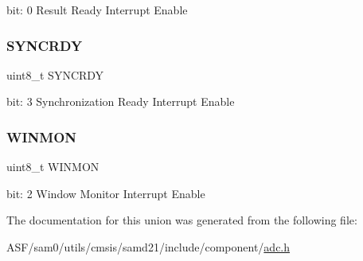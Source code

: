 bit\+: 0 Result Ready Interrupt Enable \mbox{\label{union_a_d_c___i_n_t_e_n_s_e_t___type_aece75e176e4fd55bf68937f1b56bde63}} 
\subsubsection{\texorpdfstring{SYNCRDY}{SYNCRDY}}
{\footnotesize\ttfamily uint8\+\_\+t S\+Y\+N\+C\+R\+DY}

bit\+: 3 Synchronization Ready Interrupt Enable \mbox{\label{union_a_d_c___i_n_t_e_n_s_e_t___type_a5d973ab351fe45e44b765a6621d031ef}} 
\subsubsection{\texorpdfstring{WINMON}{WINMON}}
{\footnotesize\ttfamily uint8\+\_\+t W\+I\+N\+M\+ON}

bit\+: 2 Window Monitor Interrupt Enable 

The documentation for this union was generated from the following file\+:\begin{DoxyCompactItemize}
\item 
A\+S\+F/sam0/utils/cmsis/samd21/include/component/\mbox{\hyperlink{component_2adc_8h}{adc.\+h}}\end{DoxyCompactItemize}
